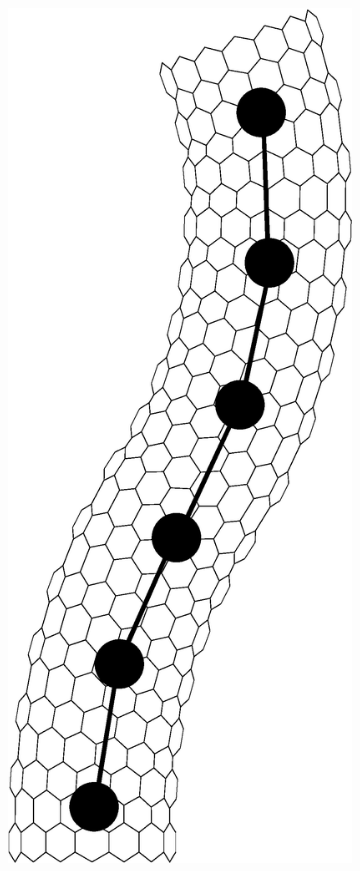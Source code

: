 \begin{figure}[t!]
\begin{subfigure}[t]{.33\textwidth}
			\centering
			\includegraphics[scale=.25]{./fig/ch1/NanotubeParticle.eps}
			\caption{\label{subfig:NanotubeParticle}}
		\end{subfigure}%
		~		
		\begin{subfigure}[t]{.33\textwidth}

\end{subfigure}
\end{figure}
